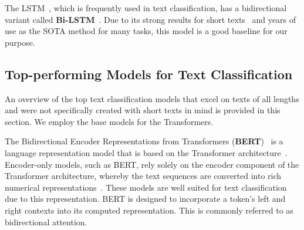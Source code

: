 \documentclass[runningheads]{llncs}
\begin{document}
The \acf{LSTM}~\cite{hochreiter1997long}, which is frequently used in text classification, has a bidirectional variant called \textbf{Bi-LSTM}~\cite{DBLP:journals/corr/LiuQH16}.
Due to its strong results for short texts~\cite{zhao2021sequential,DBLP:journals/corr/abs-1801-06717} and years of use as the \ac{SOTA} method for many tasks, this model is a good baseline for our purpose. 

\subsection{Top-performing Models for Text Classification}
\label{sec:models_long}
An overview of the top text classification models that excel on texts of all lengths and were not specifically created with short texts in mind is provided in this section.
We employ the base models for the Transformers.

\label{sec:BERT}
The Bidirectional Encoder Representations from Transformers (\textbf{BERT})~\cite{devlin2018bert} is a language representation model that is based on the Transformer architecture~\cite{vaswani2017attention}. Encoder-only models, such as \ac{BERT}, rely solely on the encoder component of the Transformer architecture, whereby the text sequences are converted into rich numerical representations~\cite{oreillyTransformer}. These models are well suited for text classification due to this representation.
\ac{BERT} is designed to incorporate a token's left and right contexts into its computed representation. This is commonly referred to as bidirectional attention.
\end{document}

